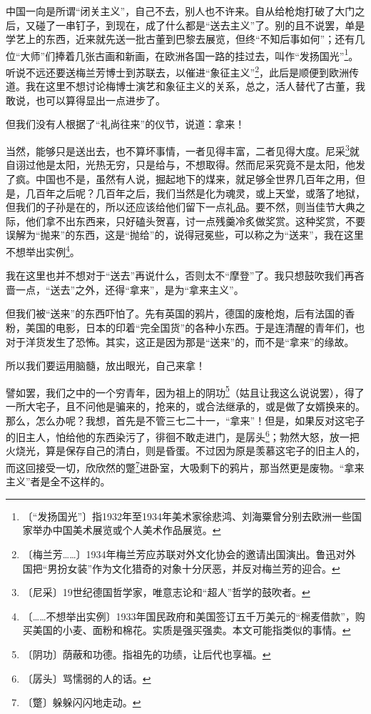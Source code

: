 \documentclass[12pt,UTF-8,openany]{ctexbook}
\begin{document}
\begin{normalsize}
    
    中国一向是所谓“闭关主义”，自己不去，别人也不许来。自从给枪炮打破了大门之后，又碰了一串钉子，到现在，成了什么都是“送去主义”了。别的且不说罢，单是学艺上的东西，近来就先送一批古董到巴黎去展览，但终“不知后事如何”；还有几位“大师”们捧着几张古画和新画，在欧洲各国一路的挂过去，叫作“发扬国光”\footnote{〔“发扬国光”〕指1932年至1934年美术家徐悲鸿、刘海粟曾分别去欧洲一些国家举办中国美术展览或个人美术作品展览。}。听说不远还要送梅兰芳博士到苏联去，以催进“象征主义”\footnote{〔梅兰芳……〕1934年梅兰芳应苏联对外文化协会的邀请出国演出。鲁迅对外国把“男扮女装”作为文化猎奇的对象十分厌恶，并反对梅兰芳的迎合。}，此后是顺便到欧洲传道。我在这里不想讨论梅博士演艺和象征主义的关系，总之，活人替代了古董，我敢说，也可以算得显出一点进步了。
    
    但我们没有人根据了“礼尚往来”的仪节，说道：拿来！
    
    当然，能够只是送出去，也不算坏事情，一者见得丰富，二者见得大度。尼采\footnote{〔尼采〕19世纪德国哲学家，唯意志论和“超人”哲学的鼓吹者。}就自诩过他是太阳，光热无穷，只是给与，不想取得。然而尼采究竟不是太阳，他发了疯。中国也不是，虽然有人说，掘起地下的煤来，就足够全世界几百年之用，但是，几百年之后呢？几百年之后，我们当然是化为魂灵，或上天堂，或落了地狱，但我们的子孙是在的，所以还应该给他们留下一点礼品。要不然，则当佳节大典之际，他们拿不出东西来，只好磕头贺喜，讨一点残羹冷炙做奖赏。这种奖赏，不要误解为“抛来”的东西，这是“抛给”的，说得冠冕些，可以称之为“送来”，我在这里不想举出实例\footnote{〔……不想举出实例〕1933年国民政府和美国签订五千万美元的“棉麦借款”，购买美国的小麦、面粉和棉花。实质是强买强卖。本文可能指类似的事情。}。
    
    我在这里也并不想对于“送去”再说什么，否则太不“摩登”了。我只想鼓吹我们再吝啬一点，“送去”之外，还得“拿来”，是为“拿来主义”。
    
    但我们被“送来”的东西吓怕了。先有英国的鸦片，德国的废枪炮，后有法国的香粉，美国的电影，日本的印着“完全国货”的各种小东西。于是连清醒的青年们，也对于洋货发生了恐怖。其实，这正是因为那是“送来”的，而不是“拿来”的缘故。
    
    所以我们要运用脑髓，放出眼光，自己来拿！
    
    譬如罢，我们之中的一个穷青年，因为祖上的阴功\footnote{〔阴功〕荫蔽和功德。指祖先的功绩，让后代也享福。}（姑且让我这么说说罢），得了一所大宅子，且不问他是骗来的，抢来的，或合法继承的，或是做了女婿换来的。那么，怎么办呢？我想，首先是不管三七二十一，“拿来”！但是，如果反对这宅子的旧主人，怕给他的东西染污了，徘徊不敢走进门，是孱头\footnote{〔孱头〕骂懦弱的人的话。}；勃然大怒，放一把火烧光，算是保存自己的清白，则是昏蛋。不过因为原是羡慕这宅子的旧主人的，而这回接受一切，欣欣然的蹩\footnote{〔蹩〕躲躲闪闪地走动。}进卧室，大吸剩下的鸦片，那当然更是废物。“拿来主义”者是全不这样的。
    

\end{normalsize}
\end{document}
